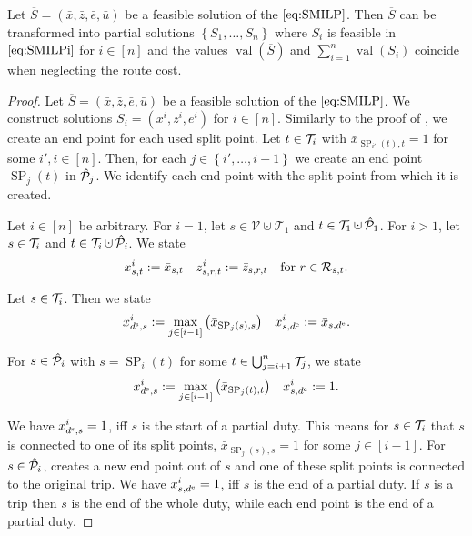 \begin{theorem}
\label{thm:equivalence_SMILP_heuristic}

Let ${\overline{S}=\left(\bar{x},\bar{z},\bar{e},\bar{u}\right)}$ be a feasible solution of the $\eqref{eq:SMILP}$. Then $\overline{S}$ can be transformed into partial solutions $\left\{S_1,\dots,S_n\right\}$ where $S_i$ is feasible in $\eqref{eq:SMILPi}$ for ${i\in[n]}$ and the values $\operatorname{val}(\overline{S})$ and ${\sum_{i=1}^n \operatorname{val}\left(S_i\right)}$ coincide when neglecting the route cost.

\end{theorem}

\begin{proof}

Let ${\overline{S}=\left(\bar{x},\bar{z},\bar{e},\bar{u}\right)}$ be a feasible solution of the $\eqref{eq:SMILP}$. We construct solutions ${S_i=\left(x^i,z^i,e^i\right)}$ for ${i\in[n]}$. Similarly to the proof of , we create an end point for each used split point. Let ${t\in\mathcal{T}_i}$ with ${\bar{x}_{\operatorname{SP}_{i'}(t),t}=1}$ for some ${i',i\in[n]}$. Then, for each ${j\in\left\{i',\dots,i-1\right\}}$ we create an end point $\operatorname{SP}_j(t)$ in $\hat{\mathcal{P}}_j$. We identify each end point with the split point from which it is created.

Let ${i\in[n]}$ be arbitrary. For ${i=1}$, let ${s\in\mathcal{V}\cupdot\mathcal{T}_1}$ and ${t\in\mathcal{T}_1\cupdot\Phat_1}$. For ${i>1}$, let ${s\in\mathcal{T}_i}$ and ${t\in\Ti\cupdot\Phat_i}$. We state
\begin{align*}
	x^i_{s,t} := \bar{x}_{s,t} && z^i_{s,r,t} := \bar{z}_{s,r,t} && \text{for } r\in\mathcal{R}_{s,t}.
\end{align*}

Let ${s\in\mathcal{T}_i}$. Then we state
\begin{align*}
	x^i_{d^{\operatorname{s}},s} := \max_{j\in[i-1]} \left(\bar{x}_{\operatorname{SP}_j(s),s}\right) && x^i_{s,d^{\operatorname{e}}} := \bar{x}_{s,d^{\operatorname{e}}}.
\end{align*}

For ${s\in\hat{\mathcal{P}}_i}$ with ${s=\operatorname{SP}_i(t)}$ for some ${t\in\bigcup_{j=i+1}^n\mathcal{T}_j}$, we state
\begin{align*}
	x^i_{d^{\operatorname{s}},s} := \max_{j\in[i-1]} \left(\bar{x}_{\operatorname{SP}_j(t),t}\right) && x^i_{s,d^{\operatorname{e}}} := 1.
\end{align*}

We have ${x^i_{d^{\operatorname{s}},s}=1}$, iff $s$ is the start of a partial duty. This means for ${s\in\mathcal{T}_i}$ that $s$ is connected to one of its split points, \ie ${\bar{x}_{\operatorname{SP}_j(s),s}=1}$ for some ${j\in[i-1]}$. For ${s\in\hat{\mathcal{P}}_i}$,  creates a new end point out of $s$ and one of these split points is connected to the original trip. We have ${x^i_{s,d^{\operatorname{e}}}=1}$, iff $s$ is the end of a partial duty. If $s$ is a trip then $s$ is the end of the whole duty, while each end point is the end of a partial duty.


\end{proof}
